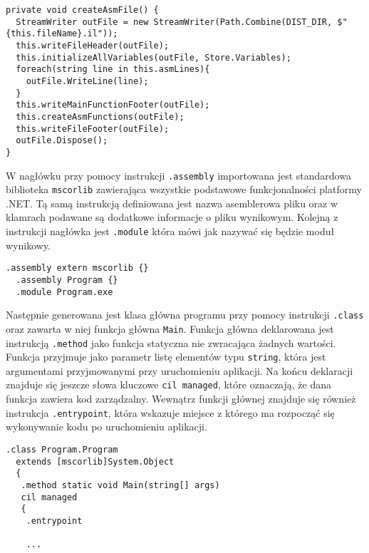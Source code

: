\begin{lstlisting}[language=CSharp, caption={Implementacja funkcji generująca plik wynikowy}, label=alg:cs]
private void createAsmFile() {
  StreamWriter outFile = new StreamWriter(Path.Combine(DIST_DIR, $"{this.fileName}.il"));
  this.writeFileHeader(outFile);
  this.initializeAllVariables(outFile, Store.Variables);
  foreach(string line in this.asmLines){
    outFile.WriteLine(line);
  }
  this.writeMainFunctionFooter(outFile);
  this.createAsmFunctions(outFile);
  this.writeFileFooter(outFile);
  outFile.Dispose();
}
\end{lstlisting}

\par W nagłówku przy pomocy instrukcji \texttt{.assembly} importowana jest standardowa biblioteka \texttt{mscorlib} zawierająca wszystkie podstawowe funkcjonalności platformy .NET. Tą samą instrukcją definiowana jest nazwa asemblerowa pliku oraz w klamrach podawane są dodatkowe informacje o pliku wynikowym. Kolejną z instrukcji nagłówka jest \texttt{.module} która mówi jak nazywać się będzie moduł wynikowy.

\begin{lstlisting}[language=IL, caption={Kod nagłówka pliku wygenerowanego pliku asemblera}, label=alg:asm]
  .assembly extern mscorlib {}
  .assembly Program {}
  .module Program.exe
\end{lstlisting}

\par Następnie generowana jest klasa główna programu przy pomocy instrukcji \texttt{.class} oraz zawarta w niej funkcja główna \texttt{Main}. Funkcja główna deklarowana jest instrukcją \texttt{.method} jako funkcja statyczna nie zwracająca żadnych wartości. Funkcja przyjmuje jako parametr listę elementów typu \texttt{string}, która jest argumentami przyjmowanymi przy uruchomieniu aplikacji. Na końcu deklaracji znajduje się jeszcze słowa kluczowe \texttt{cil managed}, które oznaczają, że dana funkcja zawiera kod zarządzalny. Wewnątrz funkcji głównej znajduje się również instrukcja \texttt{.entrypoint}, która wskazuje miejsce z którego ma rozpocząć się wykonywanie kodu po uruchomieniu aplikacji.

\begin{lstlisting}[language=IL, caption={Kod deklaracji funkcji głównej}, label=alg:asm]
  .class Program.Program
  extends [mscorlib]System.Object
  {
   .method static void Main(string[] args)
   cil managed
   {
    .entrypoint

    ...
\end{lstlisting}

